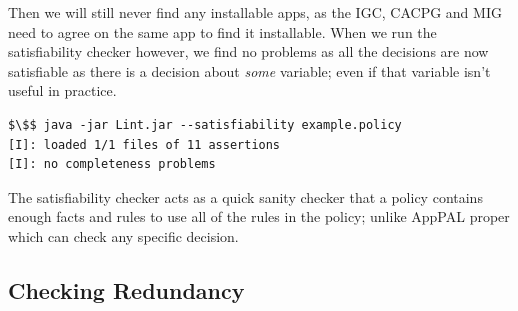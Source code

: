 \documentclass[thesis.tex]{subfiles}
\begin{document}
Then we will still never find any installable apps, as the IGC, CACPG and MIG
need to agree on the same app to find it installable.  When we run the
satisfiability checker however, we find no problems as all the decisions are now
satisfiable as there is a decision about \emph{some} variable; even if that
variable isn't useful in practice.

\begin{lstlisting}
$\$$ java -jar Lint.jar --satisfiability example.policy
[I]: loaded 1/1 files of 11 assertions
[I]: no completeness problems
\end{lstlisting}

The satisfiability checker acts as a quick sanity checker that a policy contains
enough facts and rules to use all of the rules in the policy; unlike AppPAL
proper which can check any specific decision.

%

\subsection{Checking Redundancy}
\end{document}
